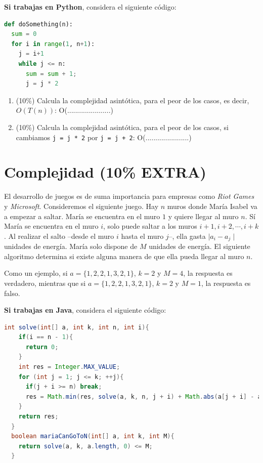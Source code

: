 \documentclass[10 pt]{article}
\begin{document}
\textbf{Si trabajas en Python}, considera el siguiente código:

\begin{lstlisting}[language=Python]
def doSomething(n):
  sum = 0
  for i in range(1, n+1):
    j = i+1
    while j <= n:
      sum = sum + 1;
      j = j * 2
\end{lstlisting}

\begin{enumerate}[label=\alph*]
\item (10\%) Calcula la complejidad asintótica, para el peor de los casos, es decir, $O(T(n))$: O(......................)
\item (10\%) Calcula la complejidad asintótica, para el peor de los casos, si cambiamos \texttt{j = j * 2} por \texttt{j = j + 2}: O(......................)
\end{enumerate}

\newpage

\section{Complejidad (10\% EXTRA)} 



El desarrollo de juegos es de suma importancia para empresas como \textit{Riot Games} y \textit{Microsoft}. Consideremos el siguiente juego. 
Hay $n$ muros donde María Isabel va a empezar a saltar. María se encuentra en el muro $1$ y quiere llegar al muro $n$. Sí María se encuentra en el muro $i$, solo puede saltar a los muros $i + 1, i + 2, \cdots, i + k$. Al realizar el salto --desde el muro $i$ hasta el muro $j$--, ella gasta $\mid a_i - a_j\mid$ unidades de energía. María solo dispone de $M$ unidades de energía. El siguiente algoritmo determina si existe alguna manera de que ella pueda llegar al muro $n$.

Como un ejemplo, si $a = \{1,2,2,1,3,2,1\}$, $k=2$ y $M=4$, la respuesta es verdadero, mientras que si $a = \{1,2,2,1,3,2,1\}$, $k=2$ y $M=1$, la respuesta es falso.

\hspace{1cm}



\textbf{Si trabajas en Java}, considera el siguiente código:

  \begin{lstlisting}[language=Java]
  int solve(int[] a, int k, int n, int i){
    if(i == n - 1){
      return 0; 
    }
    int res = Integer.MAX_VALUE;
    for (int j = 1; j <= k; ++j){
      if(j + i >= n) break;
      res = Math.min(res, solve(a, k, n, j + i) + Math.abs(a[j + i] - a[i]));
    }
    return res;
  }
  boolean mariaCanGoToN(int[] a, int k, int M){
    return solve(a, k, a.length, 0) <= M;
  }
  \end{lstlisting}
\end{document}
